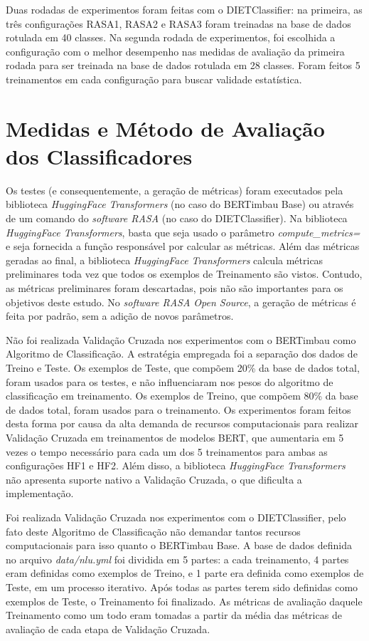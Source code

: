 Duas rodadas de experimentos foram feitas com o DIETClassifier: na primeira, as três configurações RASA1, RASA2 e RASA3 foram treinadas na base de dados rotulada em 40 classes. Na segunda rodada de experimentos, foi escolhida a configuração com o melhor desempenho nas medidas de avaliação da primeira rodada para ser treinada na base de dados rotulada em 28 classes. Foram feitos
5 treinamentos em cada configuração para buscar validade estatística.

\section{Medidas e Método de Avaliação dos Classificadores}
\label{medidas_metodo_avaliacao_classificadores}
Os testes (e consequentemente, a geração de métricas) foram executados pela biblioteca \textit{HuggingFace Transformers} (no caso do BERTimbau Base) ou através de um comando do \textit{software RASA} (no caso do DIETClassifier). Na biblioteca \textit{HuggingFace Transformers}, basta que seja usado o parâmetro \textit{compute\_metrics=} e seja fornecida a função responsável por calcular as métricas. Além das métricas geradas ao final, a biblioteca \textit{HuggingFace Transformers} calcula métricas preliminares toda vez que todos os exemplos de Treinamento são vistos. Contudo, as métricas preliminares foram descartadas, pois não são importantes para os objetivos deste estudo.  No \textit{software RASA Open Source}, a geração de métricas é feita por padrão, sem a adição de novos parâmetros.

Não foi realizada Validação Cruzada nos experimentos com o BERTimbau como Algoritmo de Classificação. A estratégia empregada foi a separação dos dados de Treino e Teste. Os exemplos de Teste, que compõem 20\% da base de dados total, foram usados para os testes, e não influenciaram nos pesos do algoritmo de classificação em treinamento. Os exemplos de Treino, que compõem 80\% da base de dados total, foram usados para o treinamento. Os experimentos foram feitos desta forma por causa da alta demanda de recursos computacionais para realizar Validação Cruzada em treinamentos de modelos BERT, que aumentaria em 5 vezes o tempo necessário para cada um dos 5 treinamentos para ambas as configurações HF1 e HF2.  Além disso, a biblioteca \textit{HuggingFace Transformers} não apresenta suporte nativo a Validação Cruzada, o que dificulta a implementação.

Foi realizada Validação Cruzada nos experimentos com o DIETClassifier, pelo fato deste Algoritmo de Classificação não demandar tantos recursos computacionais para isso quanto o BERTimbau Base. A base de dados definida no arquivo \textit{data/nlu.yml} foi dividida em 5 partes: a cada treinamento, 4 partes eram definidas como exemplos de Treino, e 1 parte era definida como exemplos de Teste, em um processo iterativo. Após todas as partes terem sido definidas como exemplos de Teste, o Treinamento foi finalizado. As métricas de avaliação daquele Treinamento como um todo eram tomadas a partir da média das métricas de avaliação de cada etapa de Validação Cruzada.

